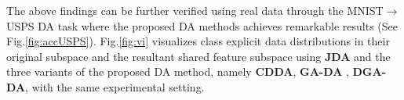\documentclass[journal,twocolumn]{IEEEtran}
\begin{document}
\begin{CJK*}{UTF8}{gkai}
		







The above findings can be further verified using real data through the MNIST$\rightarrow$USPS DA task  where the proposed DA methods achieves remarkable results (See Fig.\ref{fig:accUSPS}). Fig.\ref{fig:vi} visualizes class explicit data distributions in their original subspace and  the resultant shared feature subspace using \textbf{JDA} and the three variants of the proposed DA method, namely \textbf{CDDA}, \textbf{GA-DA} , \textbf{DGA-DA}, with the same experimental setting. 


 


\begin{itemize}
	

\end{itemize}
\end{CJK*}
\end{document}
